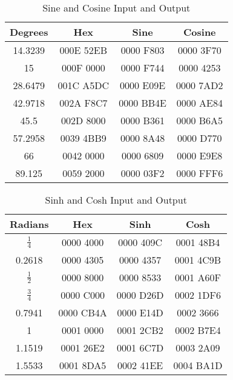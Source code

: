 \documentclass[11pt]{article}
\begin{document}
\begin{table}[h]
 \centering
 \caption{Sine and Cosine Input and Output}
 \begin{tabular}{||c c c c||}
 \hline
 Degrees & Hex & Sine & Cosine \\ [0.5ex]
 \hline\hline
 14.3239    & 000E 52EB & 0000 F803 & 0000 3F70 \\
 \hline
 15         & 000F 0000 & 0000 F744 & 0000 4253 \\
 \hline
 28.6479    & 001C A5DC & 0000 E09E & 0000 7AD2 \\
 \hline
 42.9718    & 002A F8C7 & 0000 BB4E & 0000 AE84 \\
 \hline
 45.5       & 002D 8000 & 0000 B361 & 0000 B6A5 \\
 \hline
 57.2958    & 0039 4BB9 & 0000 8A48 & 0000 D770 \\
 \hline
 66         & 0042 0000 & 0000 6809 & 0000 E9E8 \\
 \hline
 89.125     & 0059 2000 & 0000 03F2 & 0000 FFF6 \\
 \hline
\end{tabular}
\end{table}

\begin{table}[h]
 \centering
 \caption{Sinh and Cosh Input and Output}
 \begin{tabular}{||c c c c||}
 \hline
 Radians & Hex & Sinh & Cosh \\ [0.5ex]
 \hline\hline
 $\frac{1}{4}$  & 0000 4000 & 0000 409C & 0001 48B4 \\
 \hline
 0.2618         & 0000 4305 & 0000 4357 & 0001 4C9B \\
 \hline
 $\frac{1}{2}$  & 0000 8000 & 0000 8533 & 0001 A60F \\
 \hline
 $\frac{3}{4}$  & 0000 C000 & 0000 D26D & 0002 1DF6 \\
 \hline
 0.7941         & 0000 CB4A & 0000 E14D & 0002 3666 \\
 \hline
 1              & 0001 0000 & 0001 2CB2 & 0002 B7E4 \\
 \hline
 1.1519         & 0001 26E2 & 0001 6C7D & 0003 2A09 \\
 \hline
 1.5533         & 0001 8DA5 & 0002 41EE & 0004 BA1D \\
 \hline
\end{tabular}
\end{table}



\printbibliography
\end{document}
